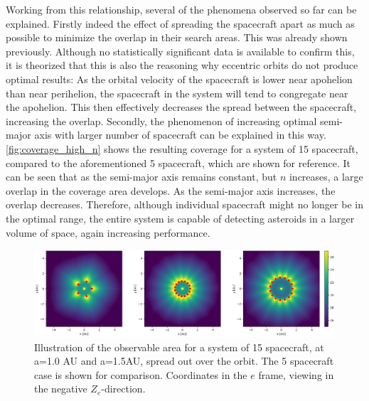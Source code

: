 Working from this relationship, several of the phenomena observed so far can be explained. Firstly indeed the effect of spreading the spacecraft apart as much as possible to minimize the overlap in their search areas. This was already shown previously. Although no statistically significant data is available to confirm this, it is theorized that this is also the reasoning why eccentric orbits do not produce optimal results: As the orbital velocity of the spacecraft is lower near apohelion than near perihelion, the spacecraft in the system will tend to congregate near the apohelion. This then effectively decreases the spread between the spacecraft, increasing the overlap. Secondly, the phenomenon of increasing optimal semi-major axis with larger number of spacecraft can be explained in this way. \autoref{fig:coverage_high_n} shows the resulting coverage for a system of 15 spacecraft, compared to the aforementioned 5 spacecraft, which are shown for reference. It can be seen that as the semi-major axis remains constant, but $n$ increases, a large overlap in the coverage area develops. As the semi-major axis increases, the overlap decreases. Therefore, although individual spacecraft might no longer be in the optimal range, the entire system is capable of detecting asteroids in a larger volume of space, again increasing performance. \\

\begin{figure}[htbp]
 \centering
 \includegraphics[width=1.0\textwidth]{img/coverage_high_n.png}
 \caption{Illustration of the observable area for a system of 15 spacecraft, at a=1.0 AU and a=1.5AU, spread out over the orbit. The 5 spacecraft case is shown for comparison. Coordinates in the $e$ frame, viewing in the negative $Z_e$-direction.}
 \label{fig:coverage_high_n}
\end{figure}

